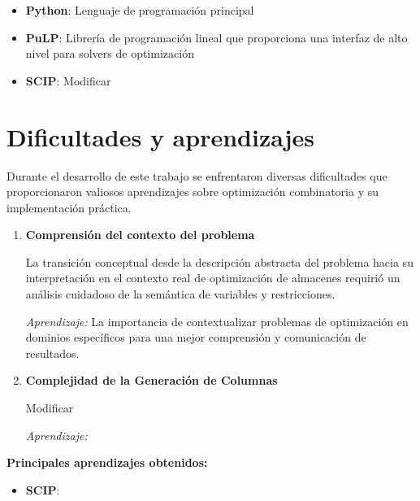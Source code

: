 \documentclass[a4paper,12pt]{article}
\begin{document}
\begin{itemize}
    \item \textbf{Python}: Lenguaje de programación principal
    \item \textbf{PuLP}: Librería de programación lineal que proporciona una interfaz de alto nivel para solvers de optimización
    \item \textbf{SCIP}: Modificar

\end{itemize}

\section{Dificultades y aprendizajes}

Durante el desarrollo de este trabajo se enfrentaron diversas dificultades que proporcionaron valiosos aprendizajes sobre optimización combinatoria y su implementación práctica.

\begin{enumerate}
    \item \textbf{Comprensión del contexto del problema}
    
    La transición conceptual desde la descripción abstracta del problema hacia su interpretación en el contexto real de optimización de almacenes requirió un análisis cuidadoso de la semántica de variables y restricciones.
    
    \emph{Aprendizaje:} La importancia de contextualizar problemas de optimización en dominios específicos para una mejor comprensión y comunicación de resultados.


    \item \textbf{Complejidad de la Generación de Columnas}
    
    Modificar
    
    \emph{Aprendizaje:} 

\end{enumerate}

\textbf{Principales aprendizajes obtenidos:}

\begin{itemize}
    \item \textbf{SCIP}: 
    
\end{itemize}
\end{document}
